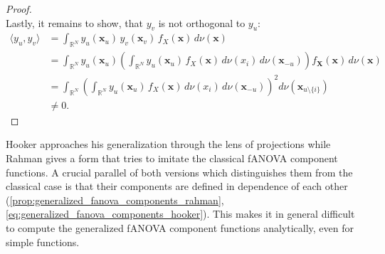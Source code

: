 \begin{proof}
\begin{equation*}
\end{equation*}
Lastly, it remains to show, that $y_v$ is not orthogonal to $y_u$:
\begin{align*}
    \langle y_u, y_v \rangle
        &= \int_{\mathbb{R}^N} y_u(\boldsymbol{x}_u) \, y_v(\boldsymbol{x}_v) \, f_X(\boldsymbol{x}) \, d \nu(\boldsymbol{x}) \\
        &= \int_{\mathbb{R}^N} y_u(\boldsymbol{x}_u) 
           \left( \int_{\mathbb{R}^N} y_u(\boldsymbol{x}_u) \, f_X(\boldsymbol{x}) \, d \nu(x_i) \, d \nu(\boldsymbol{x}_{-u}) \right) 
           f_{\boldsymbol{X}}(\boldsymbol{x}) \, d \nu(\boldsymbol{x}) \\
        &= \int_{\mathbb{R}^N} 
           \left( \int_{\mathbb{R}^N} y_u(\boldsymbol{x}_u) \, f_X(\boldsymbol{x}) \, d \nu(x_i) \, d \nu(\boldsymbol{x}_{-u}) \right)^2 
           d \nu(\boldsymbol{x}_{u \setminus \{i\}}) \\
        &\neq 0.
\end{align*}
\end{proof}
Hooker approaches his generalization through the lens of projections while Rahman gives a form that tries to imitate the classical fANOVA component functions. A crucial parallel of both versions which distinguishes them from the classical case is that their components are defined in dependence of each other (\autoref{prop:generalized_fanova_components_rahman}, \autoref{eq:generalized_fanova_components_hooker}).
This makes it in general difficult to compute the generalized fANOVA component functions analytically, even for simple functions.
